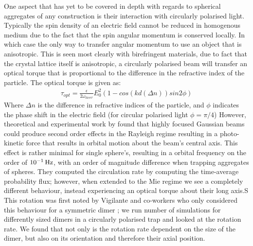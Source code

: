 One aspect that has yet to be covered in depth with regards to
spherical aggregates of any construction is their interaction with
circularly polarised light. Typically the spin density of an electric
field cannot be reduced in homogenous medium due to the fact that the
spin angular momentum is conserved locally. In which case the only way
to transfer angular momentum to use an object that is anisotropic.
This is seen most clearly with birefringent materials, due to fact that
the crystal lattice itself is anisotropic, a circularly polarised beam
will transfer an optical torque that is proportional to the difference in 
the refractive index of the particle. The optical torque is given as:
\begin{equation}
	\label{eq:opt_torque}
	\begin{aligned}
		\tau_{opt} = \frac{\epsilon}{2\omega_{laser}}E_0^2 (1-cos(kd(\Delta n))sin2\phi)
	\end{aligned}
\end{equation}
Where $\Delta n$ is the difference in refractive indices of the 
particle, and $\phi$ indicates the phase shift in the electric field
(for circular polarised light $\phi= \pi/4$) However, theoretical and
experimental work by \cite{Yevick2017} found that highly focused
Gaussian beams could produce second order effects in the Rayleigh
regime resulting in a photo-kinetic force that results in orbital
motion about the beam's central axis. This effect is rather minimal
for single sphere's, resulting in a orbital frequency on the order of
$10^{-1}\,{\rm Hz}$, with an order of magnitude difference when
trapping aggregates of spheres.  They computed the circulation rate by
computing the time-average probability flux; however, when extended to
the Mie regime we see a completely different behaviour, instead
experiencing an optical torque about their long axis.S This rotation
was first noted by Vigilante and co-workers who only considered this
behaviour for a symmetric dimer \cite{Vigilante2020}; we run number of
simulations for differently sized dimers in a circularly polarised
trap and looked at the rotation rate.  We found that not only is the
rotation rate dependent on the size of the dimer, but also on its
orientation and therefore their axial position.

